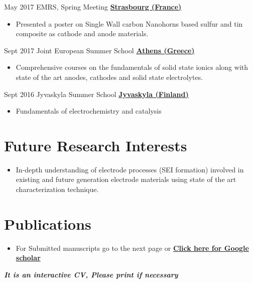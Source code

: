 \documentclass[letterpaper]{twentysecondcv} %
\begin{document}
\begin{twenty} %
	\twentyitem
    	{May 2017}
        {EMRS, Spring Meeting}
        {\href{http://www.european-mrs.com/meetings/2017-spring-meeting}{\textbf{Strasbourg (France)}}}
        {}
        {
        {\begin{itemize}
        \item Presented a poster on Single Wall carbon Nanohorns based sulfur and tin composite as cathode and anode materials.
    \end{itemize}}
        }

    \twentyitem
   		{Sept 2017}
        {Joint European Summer School}
        {\href{http://www.jess-summerschool.eu/}{\textbf{Athens (Greece)}}}
        {}
        {
        {\begin{itemize}
        \item Comprehensive courses on the fundamentals of solid state ionics along with state of the art anodes, cathodes and solid state electrolytes.
    \end{itemize}}
        }

     \twentyitem
   		{Sept 2016}
        {Jyvaskyla Summer School}
        {\href{https://www.jyu.fi/science/muut_yksikot/summerschool/en}{\textbf{Jyvaskyla (Finland)}}}
        {}
        {
        \begin{itemize}
        \item Fundamentals of electrochemistry and catalysis
    \end{itemize}
    	}

\end{twenty}

\section{Future Research Interests}
{
        {\begin{itemize}
        \item In-depth understanding of electrode processes (SEI formation) involved in existing and future generation electrode materials using state of the art characterization technique.
    \end{itemize}}
        }
\section{Publications}
{
        {\begin{itemize}
        \item For Submitted manuscripts go to the next page or \href{https://scholar.google.it/citations?hl=en&user=COCauOMAAAAJ&view_op=list_works&sortby=pubdate}{\textbf{Click here for Google scholar}}\\
    \end{itemize}}
        }
\textbf{\textit{It is an interactive CV, Please print if necessary}}
\end{document}
